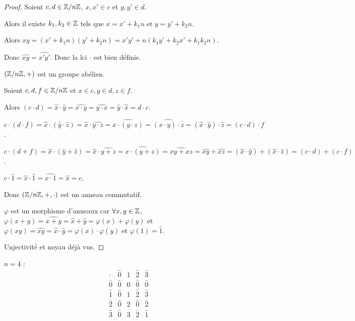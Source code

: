 \begin{proof}
    Soient $c, d \in \mathbb{Z} / n \mathbb{Z}$, $x, x' \in c$ et $y, y' \in d$. 

    Alors il existe $k_1, k_2 \in \mathbb{Z}$ tels que $x = x' + k_1 n$ et $y = y' + k_2 n$.

    Alors $xy = (x' + k_1 n)(y' + k_2 n) = x'y' + n(k_1 y' + k_2 x' + k_1 k_2 n)$.

    Donc $\widehat{xy} = \widehat{x'y'}$. Donc la lci $\cdot$ est bien définie.

    \avspace $(\mathbb{Z} / n \mathbb{Z}, +)$ est un groupe abélien.

    \avspace Soient $c, d, f \in \mathbb{Z} / n \mathbb{Z}$ et $x \in c, y \in d, z \in f$.

    Alors $(c \cdot d) = \widehat{x} \cdot \widehat{y} = \widehat{x \cdot y} = \widehat{y \cdot x} = \widehat{y} \cdot \widehat{x} = d \cdot c$.

    $c \cdot (d \cdot f) = \widehat{x} \cdot (\widehat{y} \cdot \widehat{z}) = \widehat{x} \cdot \widehat{y \cdot z} = \widehat{x \cdot (y \cdot z)} = \widehat{(x \cdot y) \cdot z} = (\widehat{x} \cdot \widehat{y}) \cdot \widehat{z} = (c \cdot d) \cdot f$.

    $c \cdot (d + f) = \widehat{x} \cdot (\widehat{y} + \widehat{z}) = \widehat{x} \cdot \widehat{y + z} = \widehat{x \cdot (y + z)} = \widehat{xy + xz} = \widehat{xy} + \widehat{xz} = (\widehat{x} \cdot \widehat{y}) + (\widehat{x} \cdot \widehat{z}) = (c \cdot d) + (c \cdot f)$.

    $c \cdot \widehat{1} = \widehat{x} \cdot \widehat{1} = \widehat{x \cdot 1} = \widehat{x} = c$.

    Donc $(\mathbb{Z} / n \mathbb{Z}, +, \cdot)$ est un anneau commutatif.

    \avspace $\varphi$ est un morphisme d'anneaux car $\forall x, y \in \mathbb{Z}$, 
    $\varphi(x + y) = \widehat{x + y} = \widehat{x} + \widehat{y} = \varphi(x) + \varphi(y)$ et 
    $\varphi(xy) = \widehat{xy} = \widehat{x} \cdot \widehat{y} = \varphi(x) \cdot \varphi(y)$ et 
    $\varphi(1) = \widehat{1}$.
    
    Unjectivité et noyau déjà vus.
\end{proof}

\begin{exemple}
    $n = 4$ :
    \[
        \begin{array}{c|cccc}
            \cdot & \widehat{0} & \widehat{1} & \widehat{2} & \widehat{3} \\
            \hline
            \widehat{0} & \widehat{0} & \widehat{0} & \widehat{0} & \widehat{0} \\
            \widehat{1} & \widehat{0} & \widehat{1} & \widehat{2} & \widehat{3} \\
            \widehat{2} & \widehat{0} & \widehat{2} & \widehat{0} & \widehat{2} \\
            \widehat{3} & \widehat{0} & \widehat{3} & \widehat{2} & \widehat{1} 
        \end{array}
    \]

\end{exemple}


